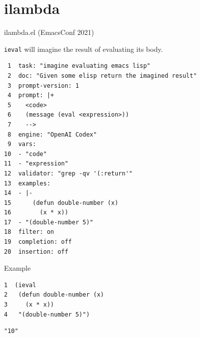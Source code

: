\documentclass[presentation]{beamer}
\begin{document}
\section{ilambda}
\label{sec:orgf36a1a5}
\begin{frame}[label={sec:org3950ac0},fragile]{ilambda.el (EmacsConf 2021)}
 \begin{block}{\texttt{ieval} will imagine the result of evaluating its body.}
{\tiny
\begin{verbatim}
 1  task: "imagine evaluating emacs lisp"
 2  doc: "Given some elisp return the imagined result"
 3  prompt-version: 1
 4  prompt: |+
 5    <code>
 6    (message (eval <expression>))
 7    --> 
 8  engine: "OpenAI Codex"
 9  vars:
10  - "code"
11  - "expression"
12  validator: "grep -qv '(:return'"
13  examples:
14  - |-
15      (defun double-number (x)
16        (x * x))
17  - "(double-number 5)"
18  filter: on
19  completion: off
20  insertion: off
\end{verbatim}
}
\end{block}

\begin{block}{Example}
{\tiny
\begin{verbatim}
1  (ieval
2   (defun double-number (x)
3     (x * x))
4   "(double-number 5)")
\end{verbatim}
}

{\tiny
\begin{verbatim}
"10"
\end{verbatim}
}
\end{block}
\end{frame}
\end{document}
